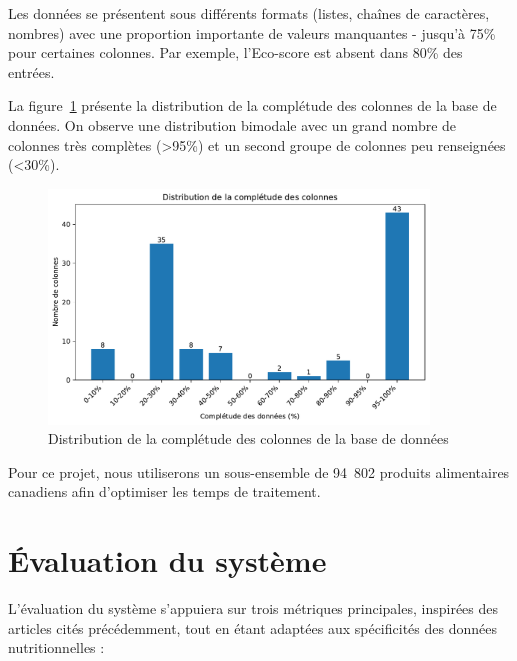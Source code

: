 \documentclass[a4paper,11pt]{article}
\begin{document}
Les données se présentent sous différents formats (listes, chaînes de caractères, nombres) avec une proportion importante de valeurs manquantes - jusqu'à 75\% pour certaines colonnes. Par exemple, l'Eco-score est absent dans 80\% des entrées.

La figure~\ref{fig:missing-values} présente la distribution de la complétude des colonnes de la base de données. On observe une distribution bimodale avec un grand nombre de colonnes très complètes (>95\%) et un second groupe de colonnes peu renseignées (<30\%).

\begin{figure}[htbp]
    \centering
    \includegraphics[width=0.9\textwidth]{figures/missing_values.pdf}
    \caption{Distribution de la complétude des colonnes de la base de données}
    \label{fig:missing-values}
\end{figure}

Pour ce projet, nous utiliserons un sous-ensemble de 94~802 produits alimentaires canadiens afin d'optimiser les temps de traitement.

\section{Évaluation du système}
\label{sec:evaluation}

L'évaluation du système s'appuiera sur trois métriques principales, inspirées des articles cités précédemment, tout en étant adaptées aux spécificités des données nutritionnelles :
\end{document}
